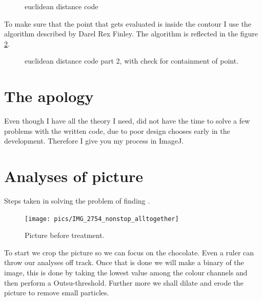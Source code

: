 \documentclass{article}
\begin{document}
\begin{figure}[H]

\caption{euclidean distance code}
\label{fig:euclid}
\end{figure}

To make sure that the point that gets evaluated is inside the contour I use the algorithm described by Darel Rex Finley\cite{darel_rex_finley_determining_2007}. The algorithm is reflected in the figure \ref{fig:contained}.
\begin{figure}[H]


\caption{euclidean distance code part 2, with check for containment of point.}
\label{fig:contained}
\end{figure}


\section{The apology}

Even though I have all the theory I need, did not have the time to solve a few problems with the written code, due to poor design chooses early in the development. Therefore I give you my process in ImageJ.

\section{Analyses of picture}
Steps taken in solving the problem of finding .
\begin{figure}[H]
\centering
\texttt{[image: pics/IMG\_2754\_nonstop\_alltogether]}
\caption{Picture before treatment.}
\label{fig:img2754nonstopalltogether}
\end{figure}

To start we crop the picture so we can focus on the chocolate. Even a ruler can throw our analyses off track. Once that is done we will make a binary of the image, this is done by taking the lowest value among the colour channels and then perform a Outsu-threshold. Further more we shall dilate and erode the picture to remove small particles.
\end{document}
